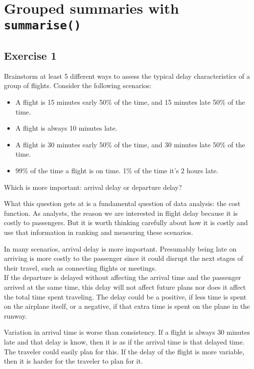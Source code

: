\documentclass[]{book}
\providecommand{\tightlist}{%
  \setlength{\itemsep}{0pt}\setlength{\parskip}{0pt}}
\theoremstyle{plain}
\theoremstyle{remark}
\theoremstyle{definition}
\theoremstyle{definition}
\theoremstyle{definition}
\theoremstyle{remark}
\begin{document}
\hypertarget{grouped-summaries-with-summarise}{%
\section{\texorpdfstring{Grouped summaries with
\texttt{summarise()}}{Grouped summaries with summarise()}}\label{grouped-summaries-with-summarise}}

\hypertarget{exercise-1-10}{%
\subsection{Exercise 1}\label{exercise-1-10}}

Brainstorm at least 5 different ways to assess the typical delay
characteristics of a group of flights. Consider the following scenarios:

\begin{itemize}
\tightlist
\item
  A flight is 15 minutes early 50\% of the time, and 15 minutes late
  50\% of the time.
\item
  A flight is always 10 minutes late.
\item
  A flight is 30 minutes early 50\% of the time, and 30 minutes late
  50\% of the time.
\item
  99\% of the time a flight is on time. 1\% of the time it's 2 hours
  late.
\end{itemize}

Which is more important: arrival delay or departure delay?

What this question gets at is a fundamental question of data analysis:
the cost function. As analysts, the reason we are interested in flight
delay because it is costly to passengers. But it is worth thinking
carefully about how it is costly and use that information in ranking and
measuring these scenarios.

In many scenarios, arrival delay is more important. Presumably being
late on arriving is more costly to the passenger since it could disrupt
the next stages of their travel, such as connecting flights or
meetings.\\
If the departure is delayed without affecting the arrival time and the
passenger arrived at the same time, this delay will not affect future
plans nor does it affect the total time spent traveling. The delay could
be a positive, if less time is spent on the airplane itself, or a
negative, if that extra time is spent on the plane in the runway.

Variation in arrival time is worse than consistency. If a flight is
always 30 minutes late and that delay is know, then it is as if the
arrival time is that delayed time. The traveler could easily plan for
this. If the delay of the flight is more variable, then it is harder for
the traveler to plan for it.
\end{document}
